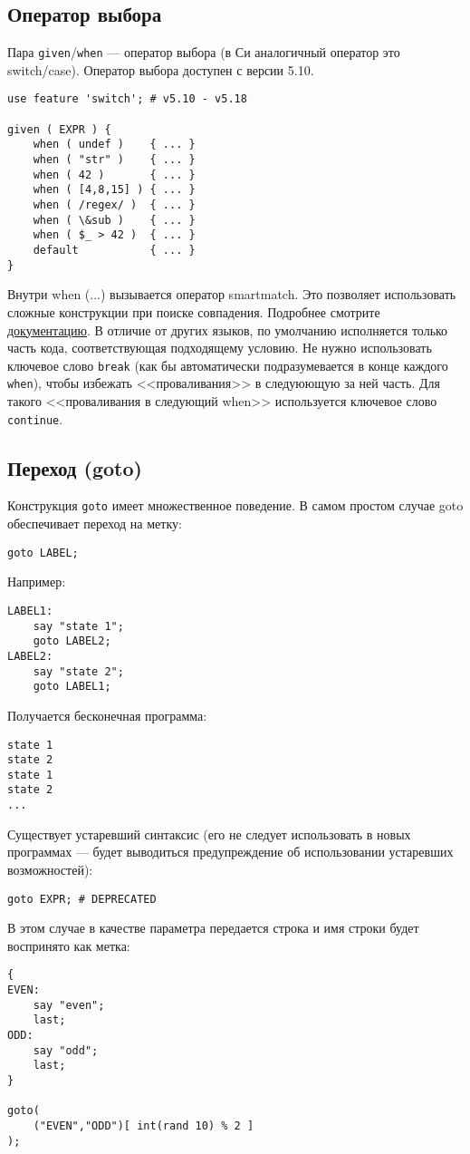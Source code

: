 \subsection{Оператор выбора}
Пара \verb|given|/\verb|when| --- оператор выбора (в Си аналогичный оператор это switch/case). Оператор выбора доступен с версии 5.10.
\begin{verbatim}
use feature 'switch'; # v5.10 - v5.18

given ( EXPR ) {
    when ( undef )    { ... }
    when ( "str" )    { ... }
    when ( 42 )       { ... }
    when ( [4,8,15] ) { ... }
    when ( /regex/ )  { ... }
    when ( \&sub )    { ... }
    when ( $_ > 42 )  { ... }
    default           { ... }
}
\end{verbatim}
Внутри when (...) вызывается оператор smartmatch. Это позволяет использовать сложные конструкции при поиске совпадения. Подробнее смотрите \href{http://perldoc.perl.org/functions/given.html}{документацию}. В отличие от других языков, по умолчанию исполняется только часть кода, соответствующая подходящему условию. Не нужно использовать ключевое слово \verb|break| (как бы автоматически подразумевается в конце каждого \verb|when|), чтобы избежать <<проваливания>> в следуюющую за ней часть. Для такого <<проваливания в следующий when>> используется ключевое слово \verb|continue|.

\subsection{Переход (goto)}
Конструкция \verb|goto| имеет множественное поведение. В самом простом случае goto обеспечивает переход на метку:
\begin{verbatim}
goto LABEL;
\end{verbatim}
Например:
\begin{verbatim}
LABEL1:
    say "state 1";
    goto LABEL2;
LABEL2:
    say "state 2";
    goto LABEL1;
\end{verbatim}
Получается бесконечная программа:
\begin{verbatim}
state 1
state 2
state 1
state 2
...
\end{verbatim}
Существует устаревший синтаксис (его не следует использовать в новых программах --- будет выводиться предупреждение об использовании устаревших возможностей):
\begin{verbatim}
goto EXPR; # DEPRECATED
\end{verbatim}
В этом случае в качестве параметра передается строка и имя строки будет воспринято как метка:
\begin{verbatim}
{
EVEN:
    say "even";
    last;
ODD:
    say "odd";
    last;
}

goto(
    ("EVEN","ODD")[ int(rand 10) % 2 ]
);
\end{verbatim}

